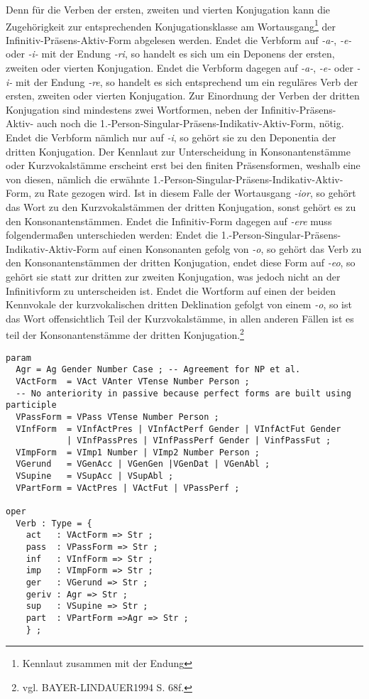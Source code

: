 \documentclass[12pt,abstract=on,titlepage,bibliography=totoc,ngerman,listof=totoc]{scrreprt}
\begin{document}
Denn für die Verben der ersten, zweiten und vierten Konjugation kann die Zugehörigkeit zur entsprechenden Konjugationsklasse am Wortausgang\footnote{Kennlaut zusammen mit der Endung} der Infinitiv-Präsens-Aktiv-Form abgelesen werden. Endet die Verbform auf \textit{-a-}, \textit{-e-} oder \textit{-i-} mit der Endung \textit{-ri}, so handelt es sich um ein Deponens der ersten, zweiten oder vierten Konjugation. Endet die Verbform dagegen auf \textit{-a-}, \textit{-e-} oder \textit{-i-} mit der Endung \textit{-re}, so handelt es sich entsprechend um ein reguläres Verb der ersten, zweiten oder vierten Konjugation. Zur Einordnung der Verben der dritten Konjugation sind mindestens zwei Wortformen, neben der Infinitiv-Präsens-Aktiv- auch noch die 1.-Person-Singular-Präsens-Indikativ-Aktiv-Form, nötig. Endet die Verbform nämlich nur auf \textit{-i}, so gehört sie zu den Deponentia der dritten Konjugation. Der Kennlaut zur Unterscheidung in Konsonantenstämme oder Kurzvokalstämme erscheint erst bei den finiten Präsensformen, weshalb eine von diesen, nämlich die erwähnte 1.-Person-Singular-Präsens-Indikativ-Aktiv-Form, zu Rate gezogen wird. Ist in diesem Falle der Wortausgang \textit{-ior}, so gehört das Wort zu den Kurzvokalstämmen der dritten Konjugation, sonst gehört es zu den Konsonantenstämmen. Endet die Infinitiv-Form dagegen auf \textit{-ere} muss folgendermaßen unterschieden werden: Endet die 1.-Person-Singular-Präsens-Indikativ-Aktiv-Form auf einen Konsonanten gefolg von \textit{-o}, so gehört das Verb zu den Konsonantenstämmen der dritten Konjugation, endet diese Form auf \textit{-eo}, so gehört sie statt zur dritten zur zweiten Konjugation, was jedoch nicht an der Infinitivform zu unterscheiden ist. Endet die Wortform auf einen der beiden Kennvokale der kurzvokalischen dritten Deklination gefolgt von einem \textit{-o}, so ist das Wort offensichtlich Teil der Kurzvokalstämme, in allen anderen Fällen ist es teil der Konsonantenstämme der dritten Konjugation.\footnote{vgl. BAYER-LINDAUER1994 S. 68f.} \par
\begin{lstlisting}[float=ht,label={GF-Res-Verb},caption={Datentyp eines Verbs im Grammatical Framework},basicstyle=\footnotesize]
param
  Agr = Ag Gender Number Case ; -- Agreement for NP et al.
  VActForm  = VAct VAnter VTense Number Person ;
  -- No anteriority in passive because perfect forms are built using participle
  VPassForm = VPass VTense Number Person ;  
  VInfForm  = VInfActPres | VInfActPerf Gender | VInfActFut Gender 
            | VInfPassPres | VInfPassPerf Gender | VinfPassFut ;
  VImpForm  = VImp1 Number | VImp2 Number Person ;
  VGerund   = VGenAcc | VGenGen |VGenDat | VGenAbl ;
  VSupine   = VSupAcc | VSupAbl ;
  VPartForm = VActPres | VActFut | VPassPerf ;

oper
  Verb : Type = {
    act   : VActForm => Str ;
    pass  : VPassForm => Str ;
    inf   : VInfForm => Str ;
    imp   : VImpForm => Str ;
    ger   : VGerund => Str ;
    geriv : Agr => Str ; 
    sup   : VSupine => Str ;
    part  : VPartForm =>Agr => Str ;
    } ;
\end{lstlisting}
\FloatBarrier
\end{document}
